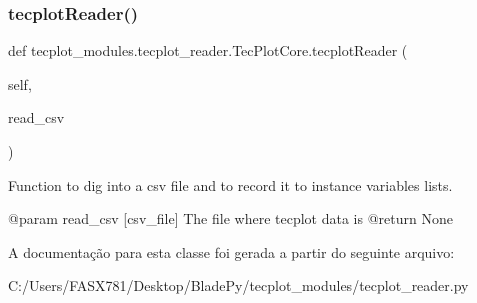 \subsubsection{\texorpdfstring{tecplot\+Reader()}{tecplotReader()}}
{\footnotesize\ttfamily def tecplot\+\_\+modules.\+tecplot\+\_\+reader.\+Tec\+Plot\+Core.\+tecplot\+Reader (\begin{DoxyParamCaption}\item[{}]{self,  }\item[{}]{read\+\_\+csv }\end{DoxyParamCaption})}

\begin{DoxyVerb}Function to dig into a csv file and to record it to instance variables lists.

@param read_csv [csv_file] The file where tecplot data is 
@return None\end{DoxyVerb}
 

A documentação para esta classe foi gerada a partir do seguinte arquivo\+:\begin{DoxyCompactItemize}
\item 
C\+:/\+Users/\+F\+A\+S\+X781/\+Desktop/\+Blade\+Py/tecplot\+\_\+modules/tecplot\+\_\+reader.\+py\end{DoxyCompactItemize}
